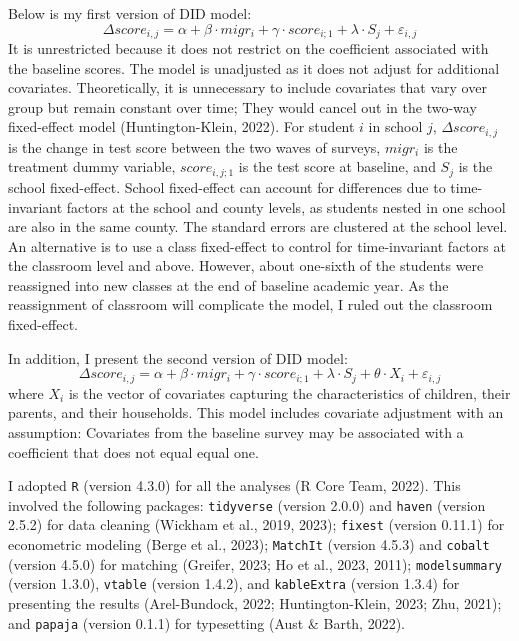 \documentclass[
  man,floatsintext]{apa7}
\begin{document}
Below is my first version of DID model: \[\Delta score_{i,j} = \alpha + \beta \cdot migr_{i} + \gamma \cdot score_{i;1} + \lambda \cdot S_{j} + \varepsilon_{i,j}\] It is unrestricted because it does not restrict on the coefficient associated with the baseline scores. The model is unadjusted as it does not adjust for additional covariates. Theoretically, it is unnecessary to include covariates that vary over group but remain constant over time; They would cancel out in the two-way fixed-effect model (Huntington-Klein, 2022). For student \(i\) in school \(j\), \(\Delta score_{i,j}\) is the change in test score between the two waves of surveys, \(migr_{i}\) is the treatment dummy variable, \(score_{i,j;1}\) is the test score at baseline, and \(S_{j}\) is the school fixed-effect. School fixed-effect can account for differences due to time-invariant factors at the school and county levels, as students nested in one school are also in the same county. The standard errors are clustered at the school level. An alternative is to use a class fixed-effect to control for time-invariant factors at the classroom level and above. However, about one-sixth of the students were reassigned into new classes at the end of baseline academic year. As the reassignment of classroom will complicate the model, I ruled out the classroom fixed-effect.

In addition, I present the second version of DID model: \[\Delta score_{i,j} = \alpha + \beta \cdot migr_{i} + \gamma \cdot score_{i;1} + \lambda \cdot S_{j} + \theta \cdot X_{i} + \varepsilon_{i,j}\] where \(X_{i}\) is the vector of covariates capturing the characteristics of children, their parents, and their households. This model includes covariate adjustment with an assumption: Covariates from the baseline survey may be associated with a coefficient that does not equal equal one.

I adopted \texttt{R} (version 4.3.0) for all the analyses (R Core Team, 2022). This involved the following packages: \texttt{tidyverse} (version 2.0.0) and \texttt{haven} (version 2.5.2) for data cleaning (Wickham et al., 2019, 2023); \texttt{fixest} (version 0.11.1) for econometric modeling (Berge et al., 2023); \texttt{MatchIt} (version 4.5.3) and \texttt{cobalt} (version 4.5.0) for matching (Greifer, 2023; Ho et al., 2023, 2011); \texttt{modelsummary} (version 1.3.0), \texttt{vtable} (version 1.4.2), and \texttt{kableExtra} (version 1.3.4) for presenting the results (Arel-Bundock, 2022; Huntington-Klein, 2023; Zhu, 2021); and \texttt{papaja} (version 0.1.1) for typesetting (Aust \& Barth, 2022).
\end{document}
